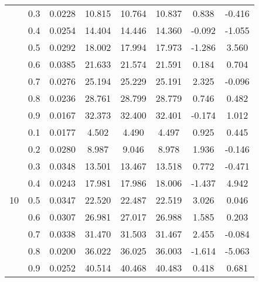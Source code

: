 \documentclass[11pt,a4paper]{report}
\begin{document}
\begin{longtable}{ | c | c || c | c | c | c | c | c | }
 & 0.3 & 0.0228 & 10.815 & 10.764 & 10.837 & 0.838 & -0.416 \\
 & 0.4 & 0.0254 & 14.404 & 14.446 & 14.360 & -0.092 & -1.055 \\
 & 0.5 & 0.0292 & 18.002 & 17.994 & 17.973 & -1.286 & 3.560 \\
 & 0.6 & 0.0385 & 21.633 & 21.574 & 21.591 & 0.184 & 0.704 \\
 & 0.7 & 0.0276 & 25.194 & 25.229 & 25.191 & 2.325 & -0.096 \\
 & 0.8 & 0.0236 & 28.761 & 28.799 & 28.779 & 0.746 & 0.482 \\
 & 0.9 & 0.0167 & 32.373 & 32.400 & 32.401 & -0.174 & 1.012 \\
 \hline
\multirow{9}{*}{10} & 0.1 & 0.0177 & 4.502 & 4.490 & 4.497 & 0.925 & 0.445 \\
 & 0.2 & 0.0280 & 8.987 & 9.046 & 8.978 & 1.936 & -0.146 \\
 & 0.3 & 0.0348 & 13.501 & 13.467 & 13.518 & 0.772 & -0.471 \\
 & 0.4 & 0.0243 & 17.981 & 17.986 & 18.006 & -1.437 & 4.942 \\
 & 0.5 & 0.0347 & 22.520 & 22.487 & 22.519 & 3.026 & 0.046 \\
 & 0.6 & 0.0307 & 26.981 & 27.017 & 26.988 & 1.585 & 0.203 \\
 & 0.7 & 0.0338 & 31.470 & 31.503 & 31.467 & 2.455 & -0.084 \\
 & 0.8 & 0.0200 & 36.022 & 36.025 & 36.003 & -1.614 & -5.063 \\
 & 0.9 & 0.0252 & 40.514 & 40.468 & 40.483 & 0.418 & 0.681 \\
 \hline
\hline
\end{longtable}
\end{document}
